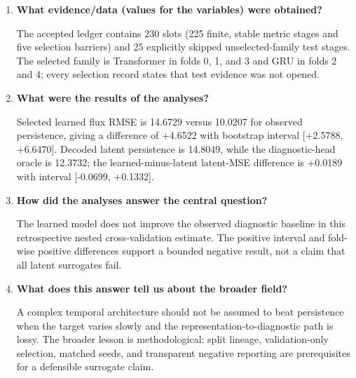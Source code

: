 \begin{enumerate}
  \item \textbf{What evidence/data (values for the variables) were obtained?}

  The accepted ledger contains 230 slots (225 finite, stable metric stages and five selection
  barriers) and 25 explicitly skipped unselected-family test stages. The selected family is Transformer in folds 0, 1, and 3 and GRU
  in folds 2 and 4; every selection record states that test evidence was not opened.

  \item \textbf{What were the results of the analyses?}

  Selected learned flux RMSE is 14.6729 versus 10.0207 for observed persistence, giving a difference
  of +4.6522 with bootstrap interval [+2.5788, +6.6470]. Decoded latent persistence is 14.8049,
  while the diagnostic-head oracle is 12.3732; the learned-minus-latent latent-MSE difference is
  +0.0189 with interval [-0.0699, +0.1332].

  \item \textbf{How did the analyses answer the central question?}

  The learned model does not improve the observed diagnostic baseline in this retrospective nested
  cross-validation estimate. The positive interval and fold-wise positive differences support a
  bounded negative result, not a claim that all latent surrogates fail.

  \item \textbf{What does this answer tell us about the broader field?}

  A complex temporal architecture should not be assumed to beat persistence when the target varies
  slowly and the representation-to-diagnostic path is lossy. The broader lesson is methodological:
  split lineage, validation-only selection, matched seeds, and transparent negative reporting are
  prerequisites for a defensible surrogate claim.
\end{enumerate}
